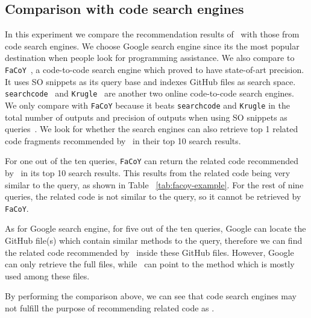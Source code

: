\subsection{Comparison with code search engines}
In this experiment we compare the recommendation results of \tool\ with those from code search engines. We choose Google search engine since its the most popular destination when people look for programming assistance. We also compare to \texttt{FaCoY}~\cite{kim2018Facoy}, a code-to-code search engine which proved to have state-of-art precision. It uses SO snippets as its query base and indexes GitHub files as search space. \texttt{searchcode}~\cite{searchcode} and \texttt{Krugle}~\cite{krugle} are another two online code-to-code search engines. We only compare with \texttt{FaCoY} because it beats \texttt{searchcode} and \texttt{Krugle} in the total number of outputs and precision of outputs when using SO snippets as queries~\cite{kim2018Facoy}. 
We look for whether the search engines can also retrieve top 1 related code fragments recommended by \tool\ in their top 10 search results. 

For one out of the ten queries, \texttt{FaCoY} can return the related code recommended by \tool\ in its top 10 search results. This results from the related code being very similar to the query, as shown in Table ~\ref{tab:facoy-example}. For the rest of nine queries, the related code is not similar to the query, so it cannot be retrieved by \texttt{FaCoY}.

As for Google search engine, for five out of the ten queries, Google can locate the GitHub file(s) which contain similar methods to the query, therefore we can find the related code recommended by \tool\ inside these GitHub files. However, Google can only retrieve the full files, while \tool\ can point to the method which is mostly used among these files. 

By performing the comparison above, we can see that code search engines may not fulfill the purpose of recommending related code as \tool{}.


